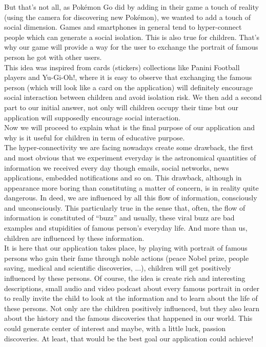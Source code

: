 \documentclass[12pt]{scrartcl}
\begin{document}
	But that’s not all, as Pokémon Go did by adding in their game a touch of reality (using the camera for discovering new Pokémon), we wanted to add a touch of social dimension. Games and smartphones in general tend to hyper-connect people which can generate a social isolation. This is also true for children. That’s why our game will provide a way for the user to exchange the portrait of famous person he got with other users.\\

	This idea was inspired from cards (stickers) collections like Panini Football players and Yu-Gi-Oh!, where it is easy to observe that exchanging the famous person (which will look like a card on the application) will definitely encourage social interaction between children and avoid isolation risk. We then add a second part to our initial answer, not only will children occupy their time but our application will supposedly encourage social interaction.\\

	Now we will proceed to explain what is the final purpose of our application and why is it useful for children in term of educative purpose.\\

	The hyper-connectivity we are facing nowadays create some drawback, the first and most obvious that we experiment everyday is the astronomical quantities of information we received every day though emails, social networks, news applications, embedded notifications and so on. This drawback, although in appearance more boring than constituting a matter of concern, is in reality quite dangerous. In deed, we are influenced by all this flow of information, consciously and unconsciously. This particularly true in the sense that, often, the flow of information is constituted of ``buzz” and usually, these viral buzz are bad examples and stupidities of famous person’s everyday life. And more than us, children are influenced by these information.\\

	It is here that our application takes place, by playing with portrait of famous persons who gain their fame through noble actions (peace Nobel prize, people saving, medical and scientific discoveries, ...), children will get positively influenced by these persons. Of course, the idea is create rich and interesting descriptions, small audio and video podcast about every famous portrait in order to really invite the child to look at the information and to learn about the life of these persons. Not only are the children positively influenced, but they also learn about the history and the famous discoveries that happened in our world. This could generate center of interest and maybe, with a little luck, passion discoveries. At least, that would be the best goal our application could achieve!\\
\end{document}
